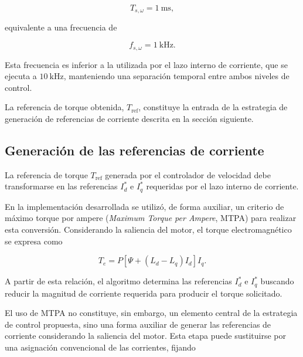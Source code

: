 \begin{equation}
T_{s,\omega}
=
1~\mathrm{ms},
\end{equation}

equivalente a una frecuencia de

\begin{equation}
f_{s,\omega}
=
1~\mathrm{kHz}.
\end{equation}

Esta frecuencia es inferior a la utilizada por el lazo interno de
corriente, que se ejecuta a $10~\mathrm{kHz}$, manteniendo una
separación temporal entre ambos niveles de control.

La referencia de torque obtenida, $T_{\mathrm{ref}}$, constituye la
entrada de la estrategia de generación de referencias de corriente
descrita en la sección siguiente.




\subsection{Generación de las referencias de corriente}
\label{subsec:referencias_corriente}

La referencia de torque $T_{\mathrm{ref}}$ generada por el controlador
de velocidad debe transformarse en las referencias $I_d^{*}$ e
$I_q^{*}$ requeridas por el lazo interno de corriente.

En la implementación desarrollada se utilizó, de forma auxiliar, un
criterio de máximo torque por ampere (\textit{Maximum Torque per
Ampere}, MTPA) para realizar esta conversión. Considerando la saliencia
del motor, el torque electromagnético se expresa como

\begin{equation}
T_e
=
P\left[\Psi+(L_d-L_q)I_d\right]I_q.
\label{eq:torque_referencias_corriente}
\end{equation}

A partir de esta relación, el algoritmo determina las referencias
$I_d^{*}$ e $I_q^{*}$ buscando reducir la magnitud de corriente
requerida para producir el torque solicitado.

El uso de MTPA no constituye, sin embargo, un elemento central de la
estrategia de control propuesta, sino una forma auxiliar de generar las
referencias de corriente considerando la saliencia del motor. Esta
etapa puede sustituirse por una asignación convencional de las
corrientes, fijando

